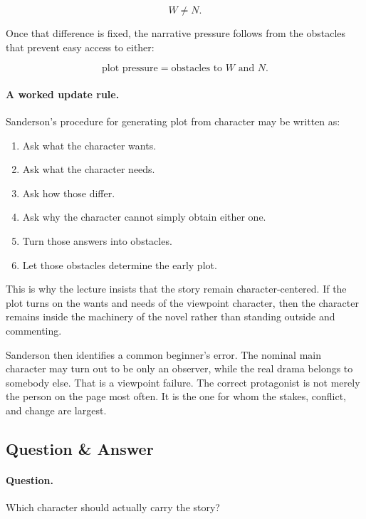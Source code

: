 \begin{equation}
W \neq N.
\end{equation}

Once that difference is fixed, the narrative pressure follows from the obstacles that prevent easy access to either:

\begin{equation}
\text{plot pressure}=\text{obstacles to }W\text{ and }N.
\end{equation}

\paragraph{A worked update rule.} Sanderson's procedure for generating plot from character may be written as:
\begin{enumerate}
\item Ask what the character wants.
\item Ask what the character needs.
\item Ask how those differ.
\item Ask why the character cannot simply obtain either one.
\item Turn those answers into obstacles.
\item Let those obstacles determine the early plot.
\end{enumerate}

This is why the lecture insists that the story remain character-centered. If the plot turns on the wants and needs of the viewpoint character, then the character remains inside the machinery of the novel rather than standing outside and commenting.

Sanderson then identifies a common beginner's error. The nominal main character may turn out to be only an observer, while the real drama belongs to somebody else. That is a viewpoint failure. The correct protagonist is not merely the person on the page most often. It is the one for whom the stakes, conflict, and change are largest.

\subsection{Question \& Answer}

\paragraph{Question.} Which character should actually carry the story?


